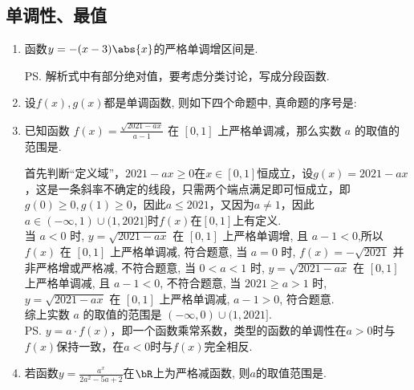 \subsection*{单调性、最值}
\begin{enumerate}
    \item 函数$y=-(x-3)\abs{x}$的严格单调增区间是\blkda{$[0,\frac{3}{2}]$}. 
    \begin{jieda}
    \ps 解析式中有部分绝对值，要考虑分类讨论，写成分段函数.
    \end{jieda}
    \item 设$f(x), g(x)$都是单调函数, 则如下四个命题中, 真命题的序号是: 
    \item 已知函数 $f(x)=\frac{\sqrt{2021-a x}}{a-1}$ 在 $[0,1]$ 上严格单调减，那么实数 $a$ 的取值的范围是\blkda[3]{$(-\infty, 0) \cup(1,2021]$}.
    \begin{jieda}
    首先判断“定义域”，$2021-ax \geq 0$在$x \in [0, 1]$恒成立，设$g(x) = 2021-ax$，这是一条斜率不确定的线段，只需两个端点满足即可恒成立，即$g(0) \geq 0, g(1) \geq 0$，因此$a \leq 2021$，又因为$a \neq 1$，因此$a \in (-\infty, 1) \cup (1, 2021]$时$f(x)$在$[0, 1]$上有定义. \\
    当 $a<0$ 时, $y=\sqrt{2021-a x}$ 在 $[0,1]$ 上严格单调增, 且 $a-1<0$,所以 $f(x)$ 在 $[0,1]$ 上严格单调减, 符合题意, 当 $a=0$ 时, $f(x)=-\sqrt{2021}$ 并非严格增或严格减, 不符合题意, 当 $0<a<1$ 时, $y=\sqrt{2021-a x}$ 在 $[0,1]$ 上严格单调减, 且 $a-1<0$, 不符合题意, 当 $2021\geq a>1$ 时, $y=\sqrt{2021-a x}$ 在 $[0,1]$ 上严格单调减, $a-1>0$, 符合题意.\\
    综上实数 $a$ 的取值的范围是 $(-\infty, 0) \cup(1,2021]$. \\
    \ps $y = a \cdot f(x)$，即一个函数乘常系数，类型的函数的单调性在$a > 0$时与$f(x)$保持一致，在$a < 0$时与$f(x)$完全相反.
    \end{jieda}
    \item 若函数$y=\frac{a^x}{2a^2-5a+2}$在$\bR$上为严格减函数, 则$a$的取值范围是. 

\end{enumerate}
